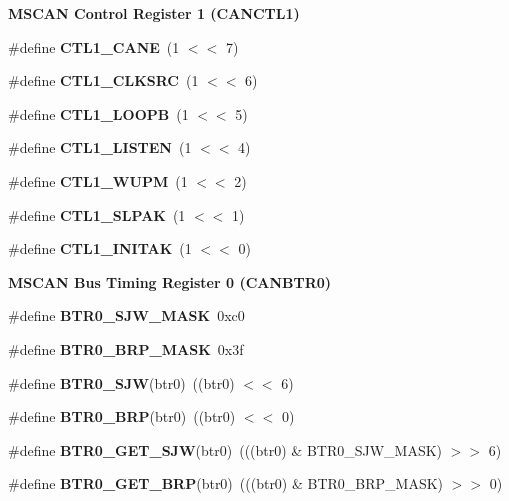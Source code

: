 \begin{Indent}\textbf{ M\+S\+C\+AN Control Register 1 (C\+A\+N\+C\+T\+L1)}\par
\begin{DoxyCompactItemize}
\item 
\#define {\bfseries C\+T\+L1\+\_\+\+C\+A\+NE}~(1 $<$$<$ 7)
\item 
\#define {\bfseries C\+T\+L1\+\_\+\+C\+L\+K\+S\+RC}~(1 $<$$<$ 6)
\item 
\#define {\bfseries C\+T\+L1\+\_\+\+L\+O\+O\+PB}~(1 $<$$<$ 5)
\item 
\#define {\bfseries C\+T\+L1\+\_\+\+L\+I\+S\+T\+EN}~(1 $<$$<$ 4)
\item 
\#define {\bfseries C\+T\+L1\+\_\+\+W\+U\+PM}~(1 $<$$<$ 2)
\item 
\#define {\bfseries C\+T\+L1\+\_\+\+S\+L\+P\+AK}~(1 $<$$<$ 1)
\item 
\#define {\bfseries C\+T\+L1\+\_\+\+I\+N\+I\+T\+AK}~(1 $<$$<$ 0)
\end{DoxyCompactItemize}
\end{Indent}
\begin{Indent}\textbf{ M\+S\+C\+AN Bus Timing Register 0 (C\+A\+N\+B\+T\+R0)}\par
\begin{DoxyCompactItemize}
\item 
\#define {\bfseries B\+T\+R0\+\_\+\+S\+J\+W\+\_\+\+M\+A\+SK}~0xc0
\item 
\#define {\bfseries B\+T\+R0\+\_\+\+B\+R\+P\+\_\+\+M\+A\+SK}~0x3f
\item 
\#define {\bfseries B\+T\+R0\+\_\+\+S\+JW}(btr0)~((btr0) $<$$<$ 6)
\item 
\#define {\bfseries B\+T\+R0\+\_\+\+B\+RP}(btr0)~((btr0) $<$$<$ 0)
\item 
\#define {\bfseries B\+T\+R0\+\_\+\+G\+E\+T\+\_\+\+S\+JW}(btr0)~(((btr0) \& B\+T\+R0\+\_\+\+S\+J\+W\+\_\+\+M\+A\+SK) $>$$>$ 6)
\item 
\#define {\bfseries B\+T\+R0\+\_\+\+G\+E\+T\+\_\+\+B\+RP}(btr0)~(((btr0) \& B\+T\+R0\+\_\+\+B\+R\+P\+\_\+\+M\+A\+SK) $>$$>$ 0)
\end{DoxyCompactItemize}
\end{Indent}
